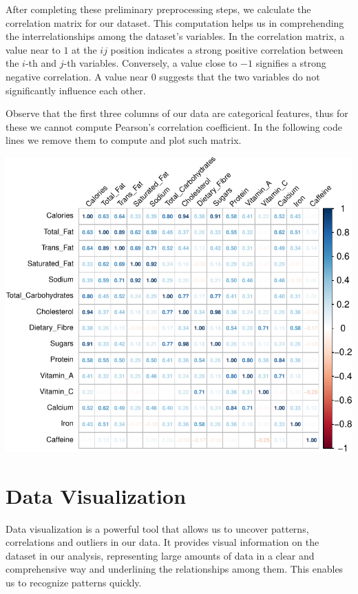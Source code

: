 \documentclass[
]{article}
\begin{document}
After completing these preliminary preprocessing steps, we calculate the
correlation matrix for our dataset. This computation helps us in
comprehending the interrelationships among the dataset's variables. In
the correlation matrix, a value near to \(1\) at the \(ij\) position
indicates a strong positive correlation between the \(i\)-th and
\(j\)-th variables. Conversely, a value close to \(-1\) signifies a
strong negative correlation. A value near \(0\) suggests that the two
variables do not significantly influence each other.

Observe that the first three columns of our data are categorical
features, thus for these we cannot compute Pearson's correlation
coefficient. In the following code lines we remove them to compute and
plot such matrix.

\begin{center}\includegraphics{Statistical_Learning_Final_Report_files/figure-latex/correlation_analysis-1} \end{center}

\section{Data Visualization}\label{data-visualization}

Data visualization is a powerful tool that allows us to uncover
patterns, correlations and outliers in our data. It provides visual
information on the dataset in our analysis, representing large amounts
of data in a clear and comprehensive way and underlining the
relationships among them. This enables us to recognize patterns quickly.
\end{document}
